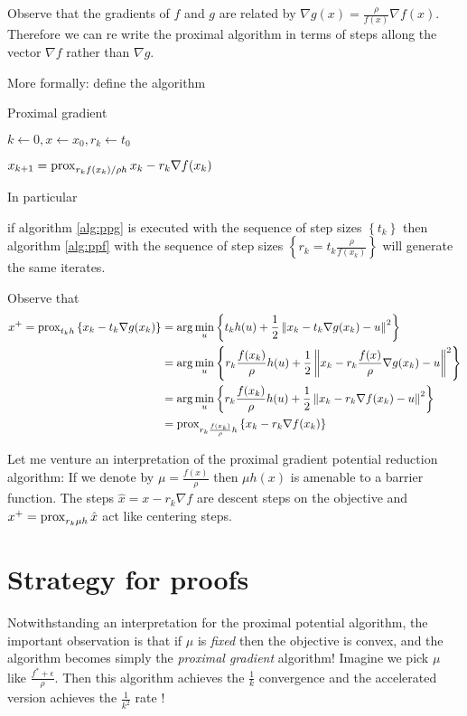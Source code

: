 \documentclass[smallextended]{article}       %
\begin{document}
Observe that the gradients of $f$ and $g$ are related by $\nabla g(x) = \frac{\rho}{f(x)}\nabla f(x)$.
Therefore we can re write the proximal algorithm in terms of steps allong the vector
$\nabla f$ rather than $\nabla g$. 

More formally: define the algorithm
\begin{algorithm}{Proximal gradient}
  \caption{Proximal Gradient}
  \begin{algorithmic}
  \STATE $k \gets 0, x \gets x_0, r_k \gets t_0$

    \STATE $x_{k+1} = \operatorname{prox}_{r_kf(x_k)/\rho h}{x_k - r_k \nabla f(x_k)}$
  \ENDWHILE
  \end{algorithmic}
  \label{alg:ppf}
\end{algorithm}

In particular 
\begin{clm}
if algorithm \eqref{alg:ppg} is executed with the sequence of 
step sizes $\left\{ t_k \right\}$ then algorithm \eqref{alg:ppf} with 
the sequence of step sizes $\left\{ r_k = t_k \frac{\rho}{f(x_k)}\right\}$ will generate the same iterates.

\end{clm}
\begin{prf}
 Observe that 
 \begin{align*}
   x^+ = \operatorname{prox}_{t_kh}\left\{x_k - t_k \nabla g(x_k)\right\} & = \arg \min_u \left\{ t_kh(u) + \frac{1}{2}\left\| x_k - t_k \nabla g(x_k)-u \right\|^2 \right\} \\
   & = \arg \min_u \left\{ r_k\frac{f(x_k)}{\rho}h(u) + \frac{1}{2}\left\| x_k - r_k\frac{f(x)}{\rho} \nabla g(x_k)-u \right\|^2 \right\} \\
   & = \arg \min_u \left\{ r_k\frac{f(x_k)}{\rho}h(u) + \frac{1}{2}\left\| x_k - r_k\nabla f(x_k)-u \right\|^2 \right\} \\
   & = \operatorname{prox}_{r_k\frac{f(x_k)}{\rho}h}\left\{x_k - r_k\nabla f(x_k)\right\}
 \end{align*} 
 \end{prf} 

 Let me venture an interpretation of the proximal gradient potential reduction algorithm:
 If we denote by $\mu = \frac{f(x)}{\rho}$ then $\mu h(x)$ is amenable to a barrier function. 
 The steps $\hat x = x - r_k\nabla f$ are descent steps on the objective and $x^+ = \operatorname{prox}_{r_k \mu h}{\hat x}$ act
 like centering steps.


 \section{Strategy for proofs}
 Notwithstanding an interpretation for the proximal potential algorithm,
 the important observation is that if $\mu$ is {\em fixed} then the
 objective is convex, and the algorithm becomes simply the {\em proximal gradient}
 algorithm! Imagine we pick $\mu$ like $\frac{f^*+\epsilon}{\rho}$.  Then this
 algorithm achieves the $\frac{1}{k}$ convergence and the accelerated version
 achieves the $\frac{1}{k^2}$ rate !
\end{document}

